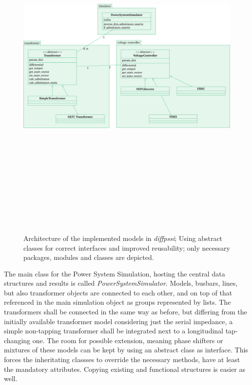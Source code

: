 \begin{figure}[htbp!]
        \centering
        \includegraphics[angle=90, height=18cm]{./tikz_graphics/images/software_structure.pdf}%
        \caption[Architecture of the implemented models in \textit{diffpssi}]{Architecture of the implemented models in \textit{diffpssi}; Using abstract classes for correct interfaces and improved reusability; only necessary packages, modules and classes are depicted.}
        \label{fig:transformer-architecture}
\end{figure}

The main class for the Power System Simulation, hosting the central data structures and results is called \textit{PowerSystemSimulator}.
Models, busbars, lines, but also transformer objects are connected to each other, and on top of that referenced in the main simulation object as groups represented by lists.
The transformers shall be connected in the same way as before, but differing from the initially available transformer model considering just the serial impedance, a simple non-tapping transformer shall be integrated next to a longitudinal tap-changing one.
The room for possible extension, meaning phase shifters or mixtures of these models can be kept by using an abstract class as interface.
This forces the inheritating classses to override the necessary methods, have at least the mandatory attributes.
Copying existing and functional structures is easier as well.

